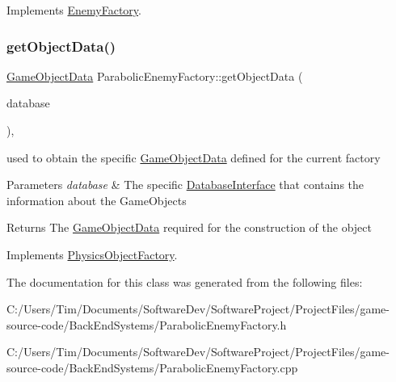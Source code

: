 Implements \hyperlink{class_enemy_factory_ae064082d650e676960cb84ebb60ba216}{Enemy\+Factory}.

\mbox{\label{class_parabolic_enemy_factory_acc62c48a8eb5af162910dc48d9fe8900}} 
\subsubsection{\texorpdfstring{get\+Object\+Data()}{getObjectData()}}
{\footnotesize\ttfamily \hyperlink{struct_game_object_data}{Game\+Object\+Data} Parabolic\+Enemy\+Factory\+::get\+Object\+Data (\begin{DoxyParamCaption}\item[{const std\+::shared\+\_\+ptr$<$ \hyperlink{class_database_interface}{Database\+Interface} $>$ \&}]{database }\end{DoxyParamCaption})\hspace{0.3cm}{\ttfamily [override]}, {\ttfamily [virtual]}}



used to obtain the specific \hyperlink{struct_game_object_data}{Game\+Object\+Data} defined for the current factory 


\begin{DoxyParams}{Parameters}
{\em database} & The specific \hyperlink{class_database_interface}{Database\+Interface} that contains the information about the Game\+Objects \\
\hline
\end{DoxyParams}
\begin{DoxyReturn}{Returns}
The \hyperlink{struct_game_object_data}{Game\+Object\+Data} required for the construction of the object 
\end{DoxyReturn}


Implements \hyperlink{class_physics_object_factory_aa59f52d3adc1fac676f4a8a3c2de9ba9}{Physics\+Object\+Factory}.



The documentation for this class was generated from the following files\+:\begin{DoxyCompactItemize}
\item 
C\+:/\+Users/\+Tim/\+Documents/\+Software\+Dev/\+Software\+Project/\+Project\+Files/game-\/source-\/code/\+Back\+End\+Systems/Parabolic\+Enemy\+Factory.\+h\item 
C\+:/\+Users/\+Tim/\+Documents/\+Software\+Dev/\+Software\+Project/\+Project\+Files/game-\/source-\/code/\+Back\+End\+Systems/Parabolic\+Enemy\+Factory.\+cpp\end{DoxyCompactItemize}
